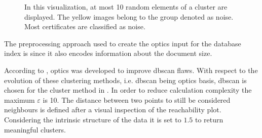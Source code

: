 \begin{figure}[!htb]
    \caption[\ac{optics} clusters]{In this visualization, at most 10 random elements of a cluster are displayed.
    The yellow images belong to the group denoted as noise.
    Most certificates are classified as noise.
    }%
    \label{fig:optics_content_cluster}%
\end{figure}


The preprocessing approach used to create the \ac{optics} input for the \databaseName{} database index is \eigendocs{} 
since it also encodes information about the document size. 

According to \citeauthor{OPTICS2014}, \ac{optics} was developed to improve \ac{dbscan} flaws.
With respect to the evolution of these clustering methods, i.e. \ac{dbscan} being \ac{optics} basis, 
\ac{dbscan} is chosen for the cluster method in .
In order to reduce calculation complexity the maximum $\varepsilon$ is 10.
The distance between two points to still be considered neighbours is defined after a visual inspection of the reachability plot.
Considering the intrinsic structure of the \eigendocs{} data it is set to $1.5$ to return meaningful clusters.